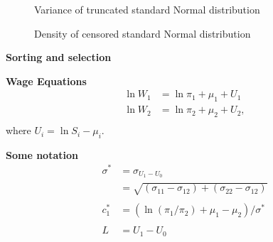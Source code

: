 \begin{frame}
\begin{figure}[htp]\centering
\caption{Variance of truncated standard Normal distribution}
\end{figure}
\end{frame}
\begin{frame}
\begin{figure}[htp]\centering
\caption{Density of censored standard Normal distribution}
\end{figure}
\end{frame}
\begin{frame}\begin{center}
	\LARGE\textbf{Sorting and selection}
\end{center}\end{frame}
\begin{frame}
	\textbf{Wage Equations}
	\begin{align*}
	\ln W_1 & = \ln \pi_1 + \mu_1 + U_1 \\
	\ln W_2 & = \ln \pi_2 + \mu_2 + U_2, \\
	\end{align*}
	where $U_i = \ln S_i - \mu_i$.
\end{frame}
\begin{frame}
	\textbf{Some notation}
	\begin{align*}
	\sigma^* & = \sigma_{U_1 - U_0} \\
			& = \sqrt{(\sigma_{11} - \sigma_{12}) +  (\sigma_{22} - \sigma_{12})}\\
			& \\
	c^*_1 & = \left(\ln(\pi_1 / \pi_2) + \mu_1 - \mu_2\right)  / \sigma^* \\
	        & \\
 		L & = U_1 - U_0
	\end{align*}
\end{frame}
